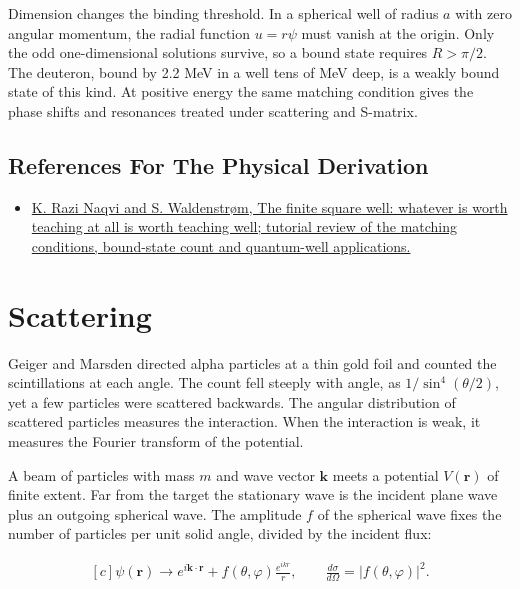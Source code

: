 \documentclass[11pt,oneside]{book}
\newenvironment{centeredalign}{\[\begin{gathered}[c]}{\end{gathered}\]}
\begin{document}
Dimension changes the binding threshold. In a spherical well of radius \(a\) with zero angular momentum, the radial function \(u=r\psi\) must vanish at the origin. Only the odd one-dimensional solutions survive, so a bound state requires \(R>\pi/2\). The deuteron, bound by 2.2 MeV in a well tens of MeV deep, is a weakly bound state of this kind. At positive energy the same matching condition gives the phase shifts and resonances treated under scattering and S-matrix.

\subsection*{References For The Physical Derivation}
\begin{itemize}
\item \href{https://arxiv.org/abs/1505.03376}{K. Razi Naqvi and S. Waldenstrøm, The finite square well: whatever is worth teaching at all is worth teaching well; tutorial review of the matching conditions, bound-state count and quantum-well applications.}
\end{itemize}





\clearpage

\section{Scattering}

\label{topic:scattering}

Geiger and Marsden directed alpha particles at a thin gold foil and counted the scintillations at each angle. The count fell steeply with angle, as \(1/\sin^4(\theta/2)\), yet a few particles were scattered backwards. The angular distribution of scattered particles measures the interaction. When the interaction is weak, it measures the Fourier transform of the potential.

A beam of particles with mass \(m\) and wave vector \(\mathbf k\) meets a potential \(V(\mathbf r)\) of finite extent. Far from the target the stationary wave is the incident plane wave plus an outgoing spherical wave. The amplitude \(f\) of the spherical wave fixes the number of particles per unit solid angle, divided by the incident flux:

\begin{centeredalign}
\psi(\mathbf r)\to e^{i\mathbf k\cdot\mathbf r}+f(\theta,\varphi)\frac{e^{ikr}}{r},\qquad
\frac{d\sigma}{d\Omega}=|f(\theta,\varphi)|^2.
\end{centeredalign}
\end{document}
